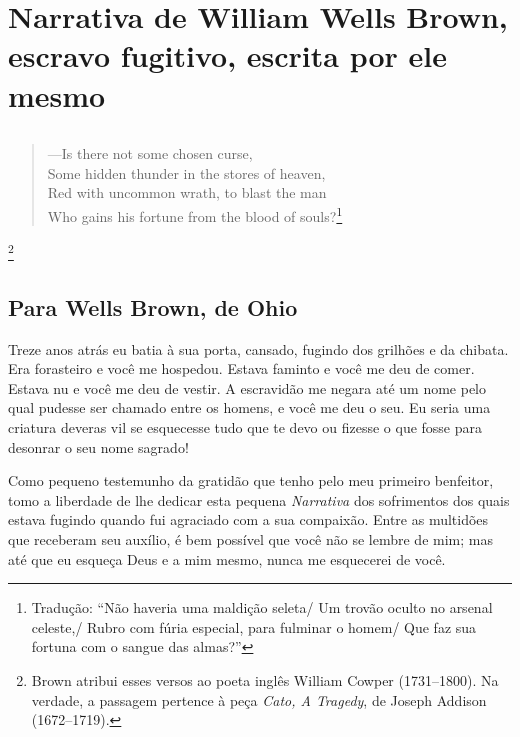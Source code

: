 \movetooddpage
{}
\part*{Narrativa de William Wells Brown, escravo fugitivo, escrita por ele mesmo}


\chapter*{}
\thispagestyle{empty}
\begin{verse}
---Is there not some chosen curse,\\
Some hidden thunder in the stores of heaven,\\
Red with uncommon wrath, to blast the man\\
Who gains his fortune from the blood of \qb{}souls?\footnote{Tradução: ``Não haveria uma maldição seleta/ Um trovão oculto no arsenal celeste,/ Rubro com fúria especial, para fulminar o homem/ Que faz sua fortuna com o sangue das almas?''}
\end{verse}
\begin{flushright}
\footnote{Brown atribui esses versos ao poeta inglês William
  Cowper (1731--1800). Na verdade, a passagem pertence à peça \emph{Cato,
  A Tragedy}, de Joseph Addison (1672--1719).}
\end{flushright}

\chapter{Para Wells Brown, de Ohio}

Treze anos atrás eu batia à sua porta, cansado, fugindo dos grilhões e
da chibata. Era forasteiro e você me hospedou. Estava faminto e você me
deu de comer. Estava nu e você me deu de vestir. A escravidão me negara
até um nome pelo qual pudesse ser chamado entre os homens, e você me deu
o seu. Eu seria uma criatura deveras vil se esquecesse tudo que te devo 
ou fizesse o que fosse para desonrar o seu nome sagrado!

Como pequeno testemunho da gratidão que tenho pelo meu primeiro
benfeitor, tomo a liberdade de lhe dedicar esta pequena \emph{Narrativa} dos
sofrimentos dos quais estava fugindo quando fui agraciado com a sua
compaixão. Entre as multidões que receberam seu auxílio, é bem possível
que você não se lembre de mim; mas até que eu esqueça Deus e a mim
mesmo, nunca me esquecerei de você.

